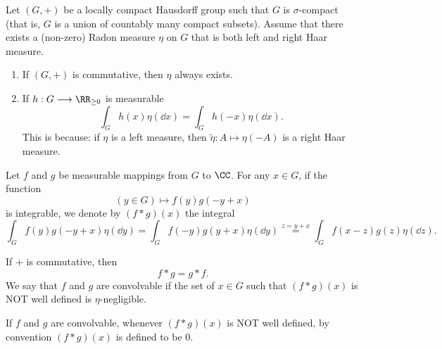 Let $(G,+)$ be a locally compact Hausdorff group such that $G$ is $\sigma$-compact (that is, $G$ is a union of countably many compact subsets).
Assume that there exists a (non-zero) Radon measure $\eta$ on $G$ that is both left and right Haar measure.

\begin{remark}
    \quad
    \begin{enumerate}[label = (\roman*)]
        \item If $(G,+)$ is commutative, then $\eta$ always exists.
        \item If $h: G \longrightarrow \RR_{\ge 0}$ is measurable
            $$\int_{G} h(x) \eta(\dd x) = \int_{G} h(- x) \eta(\dd x).$$
            This is because: if $\eta$ is a left measure, then $\tilde{\eta} : A \longmapsto \eta(-A)$ is a right Haar measure.
    \end{enumerate}
\end{remark}

\begin{definitionenv}
    Let $f$ and $g$ be measurable mappings from $G$ to $\CC$.
    For any $x \in G$, if the function
    $$(y \in G) \longmapsto f(y) g(- y + x)$$
    is integrable, we denote by $(f * g)(x)$ the integral
    $$\int_{G} f(y) g(- y + x) \eta(\dd y) = \int_{G} f(-y) g(y + x) \eta(\dd y) \overset{z = y + x}{=} \int_{G} f(x - z) g(z) \eta(\dd z).$$
\end{definitionenv}

\begin{remark}
    If $+$ is commutative, then
    $$f*g = g*f.$$
    We say that $f$ and $g$ are convolvable if the set of $x \in G$ such that $(f*g)(x)$ is NOT well defined is $\eta$-negligible.

    \quad If $f$ and $g$ are convolvable, whenever $(f*g)(x)$ is NOT well defined, by convention $(f*g)(x)$ is defined to be $0$.
\end{remark}

